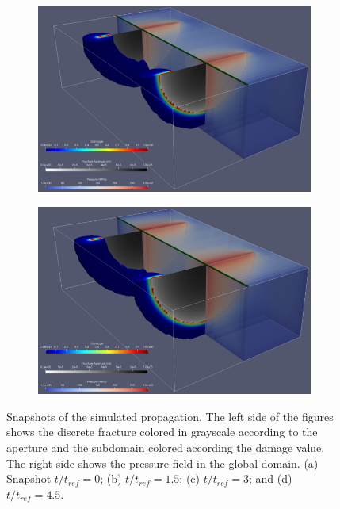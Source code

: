 \begin{figure}[h]
\begin{subfigure}{.45\textwidth}
  \centering
  \includegraphics[width=\linewidth]{Chapter4/figures/3D/t_60.png}
  \caption{}
  \label{fig:parallel_t_2}
\end{subfigure}
\hspace{0.85cm}
\begin{subfigure}{.45\textwidth}
  \centering
  \includegraphics[width=\linewidth]{Chapter4/figures/3D/t_90.png}
  \caption{}
  \label{fig:parallel_t_3}
\end{subfigure}
  \caption{Snapshots of the simulated propagation. The left side of the figures shows the discrete fracture colored in grayscale according to the aperture and the subdomain colored according the damage value. The right side shows the pressure field in the global domain. (a) Snapshot $t/t_{ref} = 0$; (b) $t/t_{ref} = 1.5$; (c) $t/t_{ref} = 3$; and (d) $t/t_{ref} = 4.5$. } 
  \label{fig:parallel_snapshots}
\end{figure}


